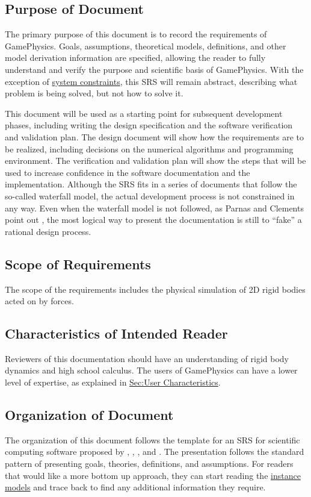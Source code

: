 \documentclass[12pt]{article}
\begin{document}
\subsection{Purpose of Document}
\label{Sec:DocPurpose}
The primary purpose of this document is to record the requirements of GamePhysics. Goals, assumptions, theoretical models, definitions, and other model derivation information are specified, allowing the reader to fully understand and verify the purpose and scientific basis of GamePhysics. With the exception of \hyperref[Sec:SysConstraints]{system constraints}, this SRS will remain abstract, describing what problem is being solved, but not how to solve it.

This document will be used as a starting point for subsequent development phases, including writing the design specification and the software verification and validation plan. The design document will show how the requirements are to be realized, including decisions on the numerical algorithms and programming environment. The verification and validation plan will show the steps that will be used to increase confidence in the software documentation and the implementation. Although the SRS fits in a series of documents that follow the so-called waterfall model, the actual development process is not constrained in any way. Even when the waterfall model is not followed, as Parnas and Clements point out \cite{parnasClements1986}, the most logical way to present the documentation is still to ``fake'' a rational design process.

\subsection{Scope of Requirements}
\label{Sec:ReqsScope}
The scope of the requirements includes the physical simulation of 2D rigid bodies acted on by forces.

\subsection{Characteristics of Intended Reader}
\label{Sec:ReaderChars}
Reviewers of this documentation should have an understanding of rigid body dynamics and high school calculus. The users of GamePhysics can have a lower level of expertise, as explained in \hyperref[Sec:UserChars]{Sec:User Characteristics}.

\subsection{Organization of Document}
\label{Sec:DocOrg}
The organization of this document follows the template for an SRS for scientific computing software proposed by \cite{koothoor2013}, \cite{smithLai2005}, \cite{smithEtAl2007}, and \cite{smithKoothoor2016}. The presentation follows the standard pattern of presenting goals, theories, definitions, and assumptions. For readers that would like a more bottom up approach, they can start reading the \hyperref[Sec:IMs]{instance models} and trace back to find any additional information they require.
\end{document}
